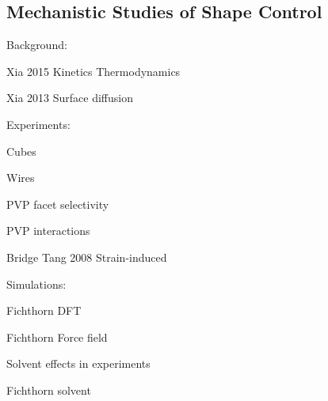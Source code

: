 \subsection{Mechanistic Studies of Shape Control}

Background:

Xia 2015 Kinetics Thermodynamics

Xia 2013 Surface diffusion

Experiments:

Cubes

Wires

PVP facet selectivity

PVP interactions

Bridge Tang 2008 Strain-induced

Simulations:

Fichthorn DFT

Fichthorn Force field

Solvent effects in experiments

Fichthorn solvent
  